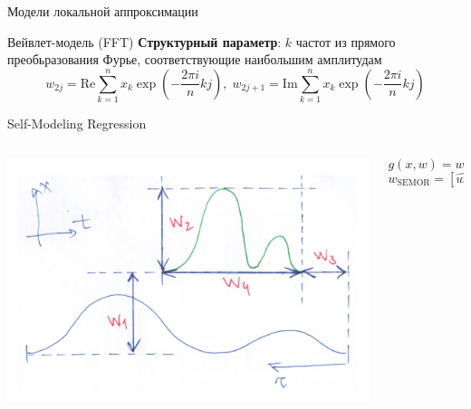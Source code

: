 \documentclass{beamer}
\newcommand{\brs}[1]{\left(#1\right)}
\begin{document}
\begin{frame}{Модели локальной аппроксимации}
    \begin{block}{Вейвлет-модель (FFT)}
        \textbf{Структурный параметр}: $k$ частот из прямого преобьразования Фурье,
        соответствующие наибольшим амплитудам
        $$
    w_{2j} = \mathrm{Re} \sum_{k=1}^{n} x_k \exp\brs{-\frac{2\pi i}{n}kj}, \; w_{2j + 1} = \mathrm{Im} \sum_{k=1}^{n} x_k \exp\brs{-\frac{2\pi i}{n}kj}
        $$
    \end{block}
    \begin{block}{Self-Modeling Regression}
        \begin{columns}
            \begin{column}{.44\textwidth}
                \begin{center}
                    \includegraphics[scale=0.18]{../pics/semor_illustration.png}
                \end{center}
            \end{column}
            \begin{column}{.56\textwidth}
                $$
                g(x, w) = w_1 + w_2 p(w_3 + w_4t),
                $$
                $$
                w_{\text{SEMOR}} = [\hat{w_1}, \hat{w_2}, \hat{w_3}, \hat{w_4}, \rho].
                $$
            \end{column}
        \end{columns}
    \end{block}
\end{frame}
\end{document}
